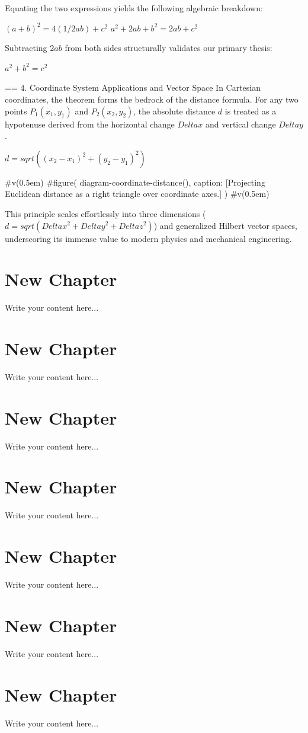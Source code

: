 Equating the two expressions yields the following algebraic breakdown:

$ (a + b)^2 = 4(1/2 a b) + c^2 $
$ a^2 + 2a b + b^2 = 2a b + c^2 $

Subtracting $2a b$ from both sides structurally validates our primary thesis:

$ a^2 + b^2 = c^2 $

== 4. Coordinate System Applications and Vector Space
In Cartesian coordinates, the theorem forms the bedrock of the distance formula. For any two points $P_1(x_1, y_1)$ and $P_2(x_2, y_2)$, the absolute distance $d$ is treated as a hypotenuse derived from the horizontal change $Delta x$ and vertical change $Delta y$.

$ d = sqrt((x_2 - x_1)^2 + (y_2 - y_1)^2) $

#v(0.5em)
#figure(
  diagram-coordinate-distance(),
  caption: [Projecting Euclidean distance as a right triangle over coordinate axes.]
)
#v(0.5em)

This principle scales effortlessly into three dimensions ($d = sqrt(Delta x^2 + Delta y^2 + Delta z^2)$) and generalized Hilbert vector spaces, underscoring its immense value to modern physics and mechanical engineering.

\chapter{New Chapter}
Write your content here...

\chapter{New Chapter}
Write your content here...

\chapter{New Chapter}
Write your content here...

\chapter{New Chapter}
Write your content here...

\chapter{New Chapter}
Write your content here...

\chapter{New Chapter}
Write your content here...

\chapter{New Chapter}
Write your content here...

